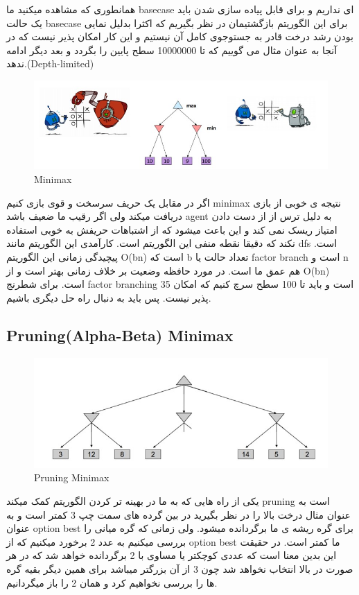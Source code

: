 همانطوری که مشاهده میکنید ما basecase ای نداریم و برای قابل پیاده سازی شدن باید یک حالت basecase برای این الگوریتم بازگشتیمان در نظر بگیریم که اکثرا بدلیل نمایی بودن رشد درخت قادر به جستوجوی کامل آن نیستیم و این کار امکان پذیر نیست که در آنجا به عنوان مثال می گوییم که تا 10000000 سطح پایین را بگردد و بعد دیگر ادامه ندهد.(Depth-limited)

\begin{figure}[h!]
    \centering
    \includegraphics[width=0.8\linewidth]{images/minimax03.jpg}
    \caption{Minimax}
\end{figure}

اگر در مقابل یک حریف سرسخت و قوی بازی کنیم minimax نتیجه ی خوبی از بازی دریافت میکند ولی اگر رقیب ما ضعیف باشد agent به دلیل ترس از از دست دادن امتیاز ریسک نمی کند و این باعث میشود که از اشتباهات حریفش به خوبی استفاده نکند که دقیقا نقطه منفی این الگوریتم است.
کارآمدی این الگوریتم مانند dfs است. پیچیدگی زمانی این الگوریتم O(bn) است که b تعداد حالت یا factor branch است  و n هم عمق ما است. در مورد حافظه وضعیت بر خلاف زمانی بهتر است  و از O(bn) است. برای شطرنج factor branching 35 است و باید تا 100 سطح سرچ کنیم که امکان پذیر نیست. پس باید به دنبال راه حل دیگری باشیم.



\subsection{Pruning(Alpha-Beta) Minimax}

\begin{figure}[h!]
    \centering
    \includegraphics[width=0.8\linewidth]{images/pruning01.jpg}
    \caption{Pruning Minimax}
\end{figure}

یکی از راه هایی که به ما در بهینه‏ تر کردن الگوریتم کمک میکند pruning است به عنوان مثال درخت بالا را در نظر بگیرید در بین گرده های سمت چپ 3 کمتر است و به عنوان option best برای گره ریشه ی ما برگردانده میشود. ولی زمانی که گره میانی را بررسی میکنیم به عدد 2 برخورد میکنیم که از option best ما کمتر است. در حقیقت این بدین معنا است که عددی کوچکتر یا مساوی با 2 برگردانده خواهد شد که در هر صورت در بالا انتخاب نخواهد شد چون 3 از آن بزرگتر میباشد برای همین دیگر بقیه گره ها را بررسی نخواهیم کرد و همان 2 را باز میگردانیم.

